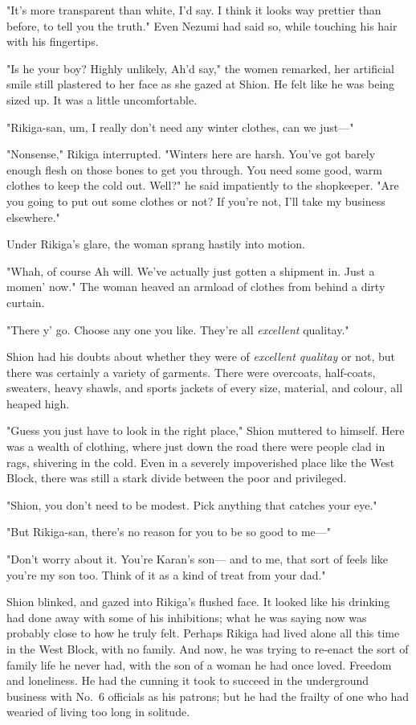 "It's more transparent than white, I'd say. I think it looks way
prettier than before, to tell you the truth." Even Nezumi had said so,
while touching his hair with his fingertips.

"Is he your boy? Highly unlikely, Ah'd say," the women remarked, her
artificial smile still plastered to her face as she gazed at Shion. He
felt like he was being sized up. It was a little uncomfortable.

"Rikiga-san, um, I really don't need any winter clothes, can we just---"

"Nonsense," Rikiga interrupted. "Winters here are harsh. You've got
barely enough flesh on those bones to get you through. You need some
good, warm clothes to keep the cold out. Well?" he said impatiently to
the shopkeeper. "Are you going to put out some clothes or not? If you're
not, I'll take my business elsewhere."

Under Rikiga's glare, the woman sprang hastily into motion.

"Whah, of course Ah will. We've actually just gotten a shipment in. Just
a momen' now." The woman heaved an armload of clothes from behind a
dirty curtain.

"There y' go. Choose any one you like. They're all \emph{excellent} qualitay."

Shion had his doubts about whether they were of \emph{excellent qualitay} or
not, but there was certainly a variety of garments. There were
overcoats, half-coats, sweaters, heavy shawls, and sports jackets of
every size, material, and colour, all heaped high.

"Guess you just have to look in the right place," Shion muttered to
himself. Here was a wealth of clothing, where just down the road there
were people clad in rags, shivering in the cold. Even in a severely
impoverished place like the West Block, there was still a stark divide
between the poor and privileged.

"Shion, you don't need to be modest. Pick anything that catches your
eye."

"But Rikiga-san, there's no reason for you to be so good to me---"

"Don't worry about it. You're Karan's son--- and to me, that sort of feels
like you're my son too. Think of it as a kind of treat from your dad."

Shion blinked, and gazed into Rikiga's flushed face. It looked like his
drinking had done away with some of his inhibitions; what he was saying
now was probably close to how he truly felt. Perhaps Rikiga had lived
alone all this time in the West Block, with no family. And now, he was
trying to re-enact the sort of family life he never had, with the son of
a woman he had once loved. Freedom and loneliness. He had the cunning it
took to succeed in the underground business with No.~6 officials as his
patrons; but he had the frailty of one who had wearied of living too
long in solitude.

